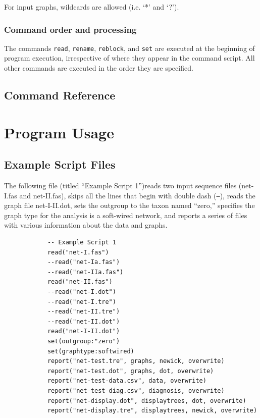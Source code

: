 \documentclass[11pt]{book}
\begin{document}
{		For input graphs, wildcards are allowed (i.e. `*' and `?').\\
	
	
	\subsection{Command order and processing}
		The commands \texttt{read}, \texttt{rename}, \texttt{reblock}, and \texttt{set} are executed at
		the beginning of program execution, irrespective of where they appear in the command script. 
		All other commands are executed in the order they are specified.


\section{Command Reference}
	

\chapter{Program Usage}
\section{Example Script Files}
	The following file (titled ``Example Script 1'')reads two input sequence files (net-I.fas and net-II.fas), 
	skips all 	the lines that begin with double dash (\texttt{--}), reads the graph file net-I-II.dot, sets the 
	outgroup to the taxon named ``zero,'' specifies the graph type for the analysis is a soft-wired network, 
	and 	reports a series of files with various information about the data and graphs.
	
		\begin{verbatim}
			-- Example Script 1
			read("net-I.fas")
			--read("net-Ia.fas")
			--read("net-IIa.fas")
			read("net-II.fas")
			--read("net-I.dot")
			--read("net-I.tre")
			--read("net-II.tre")
			--read("net-II.dot")
			read("net-I-II.dot")
			set(outgroup:"zero")
			set(graphtype:softwired)
			report("net-test.tre", graphs, newick, overwrite)
			report("net-test.dot", graphs, dot, overwrite)
			report("net-test-data.csv", data, overwrite)
			report("net-test-diag.csv", diagnosis, overwrite)
			report("net-display.dot", displaytrees, dot, overwrite)
			report("net-display.tre", displaytrees, newick, overwrite)
		\end{verbatim}
	
}
\end{document}

